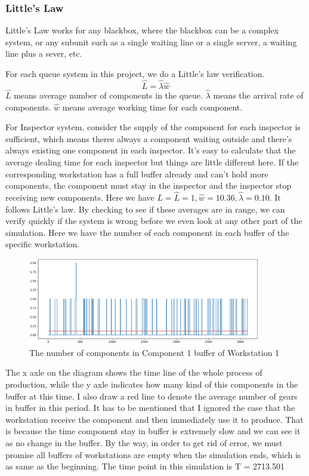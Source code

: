 \documentclass{article}
\begin{document}
\subsubsection{Little's Law}

Little's Law works for any blackbox, where the blackbox can be a complex system, or  any subunit such as a single waiting line or a single server, a waiting line plus a sever, etc. 

For each queue system in this project, we do a Little's law verification.
\begin{equation}
\hat L = \hat \lambda \hat w
\end{equation}
$\hat L$ means average number of components in the queue. $\hat \lambda$ means the arrival rate of components. $\hat w$ means average working time for each component.

For Inspector system, consider the supply of the component for each inspector is sufficient, which means theres always a component waiting outside and there's always existing one component in each inspector. It's easy to calculate that the average dealing time for each inspector but things are little different here. If the corresponding workstation has a full buffer already and can't hold more components, the component must stay in the inspector and the inspector stop receiving new components. Here we have $L=\hat L =1, \hat w = 10.36, \hat \lambda = 0.10$. It follows Little's law. By checking to see if these averages are in range, we can verify quickly if the system is wrong before we even look at any other part of the simulation.
Here we have the number of each component in each buffer of the specific workstation.

\begin{figure}[htbp]
\begin{center}
\includegraphics[width=4in]{W1_C1B.png}
\caption{The number of components in Component 1 buffer of Workstation 1}
\label{W1_C1B}
\end{center}
\end{figure}

The x axle on the diagram shows the time line of the whole process of production, while the y axle indicates how many kind of this components in the buffer at this time. I also draw a red line to denote the average number of gears in buffer in this period. It has to be mentioned that I ignored the case that the workstation receive the component and then immediately use it to produce. That is because the time component stay in buffer is extremely slow and we can see it as no change in the buffer. By the way, in order to get rid of error, we must promise all buffers of workstations are empty when the simulation ends, which is as same as the beginning. The time point in this simulation is T = 2713.501
\end{document}
